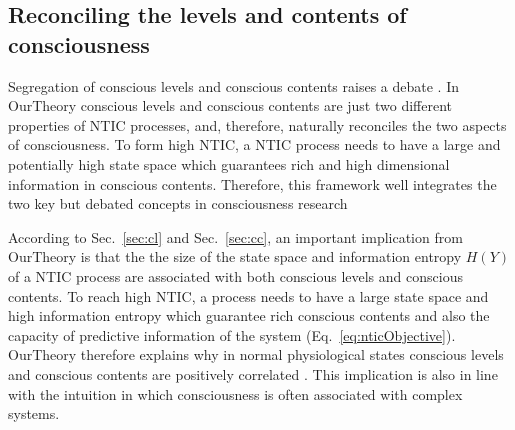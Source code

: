 \documentclass[utf8]{article}
\begin{document}
            
	    \subsection{Reconciling the levels and contents of consciousness}\label{sec:reconcile}
    	    Segregation of conscious levels and conscious contents raises a debate \citep{bayne2016there, Fazekas2016}. In \ac{OurTheory} conscious levels and conscious contents are just two different properties of NTIC processes, and, therefore, naturally reconciles the two aspects of consciousness. To form high NTIC, a NTIC process needs to have a large and potentially high state space which guarantees rich and high dimensional information in conscious contents. Therefore, this framework well integrates the two key but debated concepts in consciousness research
    	    
    	    
    	    According to Sec.~\ref{sec:cl} and Sec.~\ref{sec:cc}, an important implication from \ac{OurTheory} is that the the size of the state space and information entropy $H(Y)$ of a NTIC process are associated with both conscious levels and conscious contents. To reach high NTIC, a process needs to have a large state space and high information entropy which guarantee rich conscious contents and also the capacity of predictive information of the system (Eq.~\ref{eq:nticObjective}).
    	    \ac{OurTheory} therefore explains why in normal physiological states conscious levels and conscious contents are positively correlated \citep{laureys2005neural}. This implication is also in line with the intuition in which consciousness is often associated with complex systems.
    			
\end{document}
